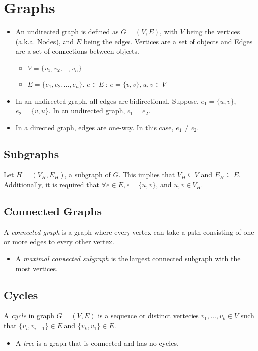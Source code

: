 \documentclass[10pt]{article}
\begin{document}
\section*{Graphs}
\begin{itemize}
	\item An undirected graph is defined as $G=(V, E)$, with $V$ being the vertices (a.k.a. Nodes), and $E$ being the edges.  Vertices are a set of objects and Edges are a set of connections between objects.
	\begin{itemize}
        \item $V = \{v_1, v_2, \dots, v_n\}$
        \item $E = \{e_1, e_2, \dots, e_n\}$.  $e \in E \::\: e = \{u, v\}, u, v \in V$ 
    \end{itemize}
    \item In an undirected graph, all edges are bidirectional.  Suppose, $e_1 = \{u, v\}$, $e_2 = \{v, u\}$.  In an undirected graph, $e_1 = e_2$.
    \item In a directed graph, edges are one-way.  In this case, $e_1 \neq e_2$.
\end{itemize}

\subsection*{Subgraphs}
Let $H = (V_H, E_H)$, a subgraph of $G$.  This implies that $V_H \subseteq V$ and $E_H \subseteq E$.  Additionally, it is required that $\forall e \in E, e = \{u, v\}$, and $u, v \in V_H$.

\subsection*{Connected Graphs}
A \textit{connected graph} is a graph where every vertex can take a path consisting of one or more edges to every other vertex.
\begin{itemize}
	\item A \textit{maximal connected subgraph} is the largest connected subgraph with the most vertices.
\end{itemize}

\subsection*{Cycles}
A \textit{cycle} in graph $G = (V, E)$ is a sequence or distinct vertecies $v_1, \dots, v_k \in V$ such that $\{v_i, v_{i + 1}\} \in E$ and $\{v_k, v_1\} \in E$.
\begin{itemize}
	\item A \textit{tree} is a graph that is connected and has no cycles.
\end{itemize}
\end{document}
